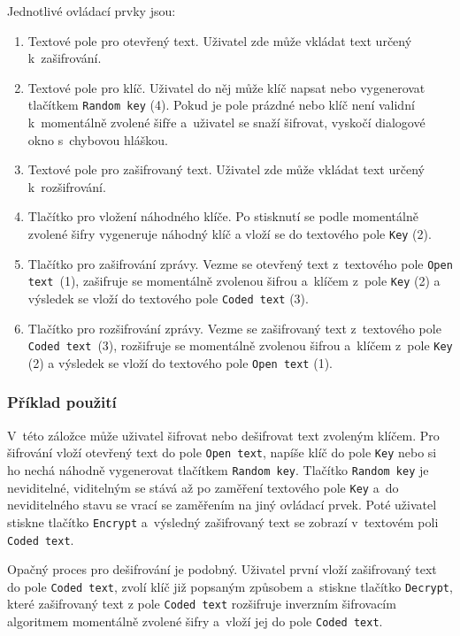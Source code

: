 \documentclass[glossaries, index]{kidiplom}
\begin{document}
Jednotlivé ovládací prvky jsou:
\begin{enumerate}
  \item Textové pole pro otevřený text. Uživatel zde může vkládat text určený k~zašifrování.
  \item Textové pole pro klíč. Uživatel do něj může klíč napsat nebo vygenerovat tlačítkem \texttt{Random key} (4). Pokud je pole prázdné nebo klíč není validní k~momentálně zvolené šifře a~uživatel se snaží šifrovat, vyskočí dialogové okno s~chybovou hláškou.
  \item Textové pole pro zašifrovaný text. Uživatel zde může vkládat text určený k~rozšifrování.
  \item Tlačítko pro vložení náhodného klíče. Po stisknutí se podle momentálně zvolené šifry vygeneruje náhodný klíč a vloží se do textového pole \texttt{Key} (2).
  \item Tlačítko pro zašifrování zprávy. Vezme se otevřený text z~textového pole \texttt{Open text}~(1), zašifruje se momentálně zvolenou šifrou a~klíčem z~pole \texttt{Key} (2) a výsledek se vloží do textového pole \texttt{Coded text} (3).
  \item Tlačítko pro rozšifrování zprávy. Vezme se zašifrovaný text z~textového pole \texttt{Coded text}~(3), rozšifruje se momentálně zvolenou šifrou a~klíčem z~pole \texttt{Key} (2) a výsledek se vloží do textového pole \texttt{Open text} (1).
\end{enumerate}

\subsubsection{Příklad použití}
V~této záložce může uživatel šifrovat nebo dešifrovat text zvoleným klíčem. Pro šifrování vloží otevřený text do pole \texttt{Open text}, napíše klíč do pole \texttt{Key} nebo si ho nechá náhodně vygenerovat tlačítkem \texttt{Random key}. Tlačítko \texttt{Random key} je neviditelné, viditelným se stává až po zaměření textového pole \texttt{Key} a~do neviditelného stavu se vrací se zaměřením na jiný ovládací prvek. Poté uživatel stiskne tlačítko \texttt{Encrypt} a~výsledný zašifrovaný text se zobrazí v~textovém poli \texttt{Coded text}.

Opačný proces pro dešifrování je podobný. Uživatel první vloží zašifrovaný text do pole \texttt{Coded text}, zvolí klíč již popsaným způsobem a~stiskne tlačítko \texttt{Decrypt}, které zašifrovaný text z pole \texttt{Coded text} rozšifruje inverzním šifrovacím algoritmem momentálně zvolené šifry a~vloží jej do pole \texttt{Coded text}.
\end{document}
